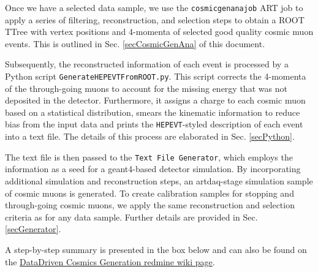 \documentclass[12pt]{article}
\begin{document}
Once we have a selected data sample, we use the \texttt{cosmicgenanajob} ART job to apply a series of filtering, reconstruction, and selection steps to obtain a ROOT TTree with vertex positions and 4-momenta of selected good quality cosmic muon events. This is outlined in Sec. \ref{secCosmicGenAna} of this document.

Subsequently, the reconstructed information of each event is processed by a Python script \texttt{GenerateHEPEVTFromROOT.py}. This script corrects the 4-momenta of the through-going muons to account for the missing energy that was not deposited in the detector. Furthermore, it assigns a charge to each cosmic muon based on a statistical distribution, smears the kinematic information to reduce bias from the input data and prints the \texttt{HEPEVT}-styled \cite{HEPEVTFormat} description of each event into a text file. The details of this process are elaborated in Sec. \ref{secPython}.

The text file is then passed to the \texttt{Text File Generator}, which employs the information as a seed for a geant4-based \cite{GEANT4} detector simulation. By incorporating additional simulation and reconstruction steps, an artdaq-stage simulation sample of cosmic muons is generated. To create calibration samples for stopping and through-going cosmic muons, we apply the same reconstruction and selection criteria as for any data sample. Further details are provided in Sec. \ref{secGenerator}. 

A step-by-step summary is presented in the box below and can also be found on the \href{https://cdcvs.fnal.gov/redmine/projects/novaart/wiki/DataDriven\_Cosmics}{DataDriven Cosmics Generation redmine wiki page}.
\end{document}

